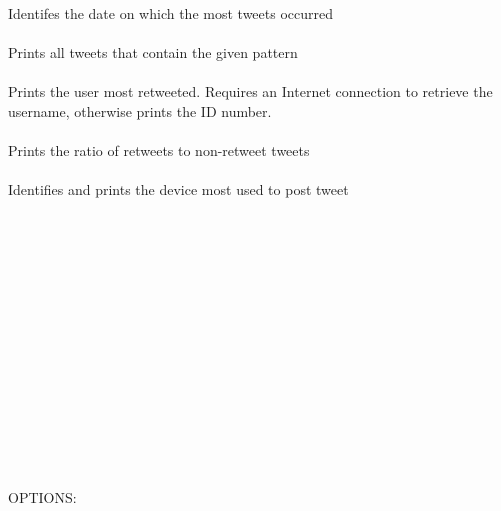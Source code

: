 \documentclass{article}
\begin{document}
\parbox[t][3cm][t]{7cm}{\normalsize Identifes the date on which the most tweets occurred\\
\\
Prints all tweets that contain the given pattern\\
\\
Prints the user most retweeted. Requires an Internet connection to retrieve the username, otherwise prints the ID number.\\ 
\\
Prints the ratio of retweets to non-retweet tweets\\
\\
Identifies and prints the device most used to post tweet\\}
\\
\\
\\
\\
\\
\\
\\
\\
\\
\\
\\
\\
\\
\\
\noindent
OPTIONS:
\end{document}
